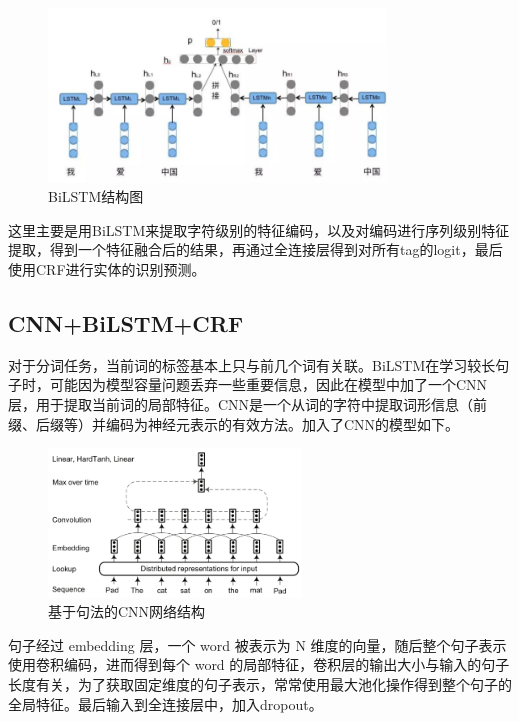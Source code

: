 \documentclass[a4paper, 12pt]{article}
\begin{document}
\begin{figure}[htbp]
    \centering
    \includegraphics[width=0.8\textwidth]{BiLSTM}
    \caption{BiLSTM结构图}
    \label{fig:bilstm}
\end{figure}

这里主要是用BiLSTM来提取字符级别的特征编码，以及对编码进行序列级别特征提取，得到一个特征融合后的结果，再通过全连接层得到对所有tag的logit，最后使用CRF进行实体的识别预测\cite{huang2015bidirectional}。


\subsection{CNN+BiLSTM+CRF} %
\label{sub:cnn}
对于分词任务，当前词的标签基本上只与前几个词有关联。BiLSTM在学习较长句子时，可能因为模型容量问题丢弃一些重要信息，因此在模型中加了一个CNN层，用于提取当前词的局部特征\cite{ma2016endtoend}。CNN是一个从词的字符中提取词形信息（前缀、后缀等）并编码为神经元表示的有效方法。加入了CNN的模型如下\cite{chiu-nichols-2016-named}。

\begin{figure}[htbp]
    \centering
    \includegraphics[width=0.6\textwidth]{cnn}
    \caption{基于句法的CNN网络结构}
    \label{fig:encoder}
\end{figure}

句子经过 embedding 层，一个 word 被表示为 N 维度的向量，随后整个句子表示使用卷积编码，进而得到每个 word 的局部特征，卷积层的输出大小与输入的句子长度有关，为了获取固定维度的句子表示，常常使用最大池化操作得到整个句子的全局特征。最后输入到全连接层中，加入dropout。
\end{document}
